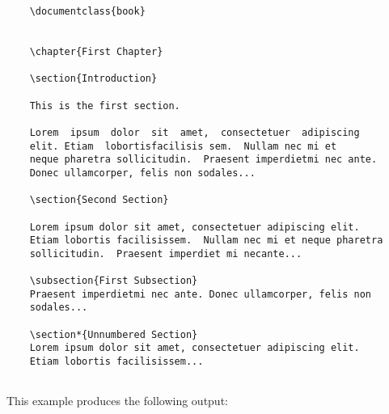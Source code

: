 \begin{tcolorbox}
\begin{verbatim}
    \documentclass{book}
    

    \chapter{First Chapter}

    \section{Introduction}

    This is the first section.

    Lorem  ipsum  dolor  sit  amet,  consectetuer  adipiscing  
    elit. Etiam  lobortisfacilisis sem.  Nullam nec mi et 
    neque pharetra sollicitudin.  Praesent imperdietmi nec ante. 
    Donec ullamcorper, felis non sodales...

    \section{Second Section}

    Lorem ipsum dolor sit amet, consectetuer adipiscing elit.  
    Etiam lobortis facilisissem.  Nullam nec mi et neque pharetra 
    sollicitudin.  Praesent imperdiet mi necante...

    \subsection{First Subsection}
    Praesent imperdietmi nec ante. Donec ullamcorper, felis non 
    sodales...

    \section*{Unnumbered Section}
    Lorem ipsum dolor sit amet, consectetuer adipiscing elit.  
    Etiam lobortis facilisissem...
    
\end{verbatim}
\end{tcolorbox}

This example produces the following output:


